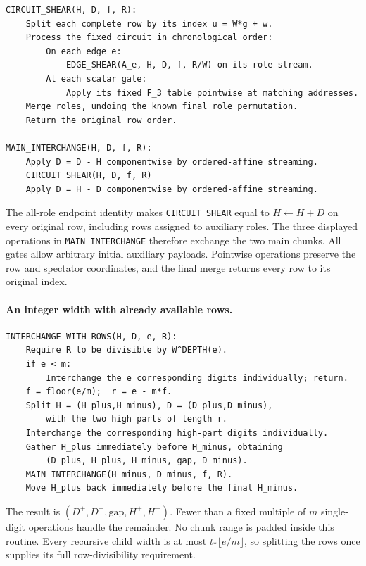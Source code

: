 \begin{verbatim}
CIRCUIT_SHEAR(H, D, f, R):
    Split each complete row by its index u = W*g + w.
    Process the fixed circuit in chronological order:
        On each edge e:
            EDGE_SHEAR(A_e, H, D, f, R/W) on its role stream.
        At each scalar gate:
            Apply its fixed F_3 table pointwise at matching addresses.
    Merge roles, undoing the known final role permutation.
    Return the original row order.

MAIN_INTERCHANGE(H, D, f, R):
    Apply D = D - H componentwise by ordered-affine streaming.
    CIRCUIT_SHEAR(H, D, f, R)
    Apply D = H - D componentwise by ordered-affine streaming.
\end{verbatim}

The all-role endpoint identity makes \texttt{CIRCUIT\_SHEAR} equal to
$H\leftarrow H+D$ on every original row, including rows assigned to
auxiliary roles.  The three displayed operations in
\texttt{MAIN\_INTERCHANGE} therefore exchange the two main chunks.
All gates allow arbitrary initial auxiliary payloads.  Pointwise
operations preserve the row and spectator coordinates, and the final
merge returns every row to its original index.

\paragraph{An integer width with already available rows.}

\begin{verbatim}
INTERCHANGE_WITH_ROWS(H, D, e, R):
    Require R to be divisible by W^DEPTH(e).
    if e < m:
        Interchange the e corresponding digits individually; return.
    f = floor(e/m);  r = e - m*f.
    Split H = (H_plus,H_minus), D = (D_plus,D_minus),
        with the two high parts of length r.
    Interchange the corresponding high-part digits individually.
    Gather H_plus immediately before H_minus, obtaining
        (D_plus, H_plus, H_minus, gap, D_minus).
    MAIN_INTERCHANGE(H_minus, D_minus, f, R).
    Move H_plus back immediately before the final H_minus.
\end{verbatim}

The result is
$(D^+,D^-,\mathrm{gap},H^+,H^-)$.  Fewer than a fixed multiple of $m$
single-digit operations handle the remainder.  No chunk range is padded
inside this routine.  Every recursive child width is at most
$t_*\lfloor e/m\rfloor$, so splitting the rows once supplies its full
row-divisibility requirement.

